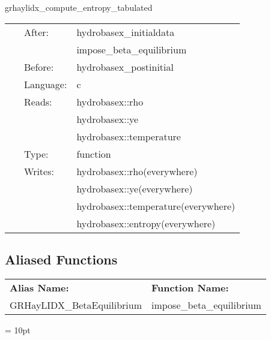 \documentclass{article}
\begin{document}
\hspace{5mm} grhaylidx\_compute\_entropy\_tabulated 

\hspace{5mm}{\it computes entropy from density, y\_e, and temperature using tabulated eos } 


\hspace{5mm}

 \begin{tabular*}{160mm}{cll} 
~ & After:  & hydrobasex\_initialdata \\ 
~& ~ &impose\_beta\_equilibrium\\ 
~ & Before:  & hydrobasex\_postinitial \\ 
~ & Language:  & c \\ 
~ & Reads:  & hydrobasex::rho \\ 
~& ~ &hydrobasex::ye\\ 
~& ~ &hydrobasex::temperature\\ 
~ & Type:  & function \\ 
~ & Writes:  & hydrobasex::rho(everywhere) \\ 
~& ~ &hydrobasex::ye(everywhere)\\ 
~& ~ &hydrobasex::temperature(everywhere)\\ 
~& ~ &hydrobasex::entropy(everywhere)\\ 
\end{tabular*} 


\subsection*{Aliased Functions}

\hspace{5mm}

 \begin{tabular*}{160mm}{ll} 

{\bf Alias Name:} ~~~~~~~ & {\bf Function Name:} \\ 
GRHayLIDX\_BetaEquilibrium & impose\_beta\_equilibrium \\ 
\end{tabular*} 



\vspace{5mm}\parskip = 10pt 
\end{document}
